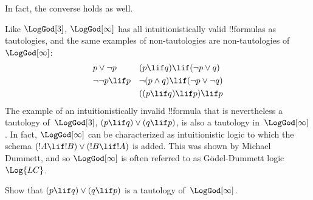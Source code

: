 \documentclass[../../../include/open-logic-section]{subfiles}
\begin{document}
In fact, the converse holds as well.

Like $\LogGod[3]$, $\LogGod[\infty]$ has all intuitionistically valid
!!{formula}s as tautologies, and the same examples of non-tautologies
are non-tautologies of~$\LogGod[\infty]$:
\begin{align*}
  & p \lor \lnot p && (p \lif q) \lif (\lnot p \lor q) \\
  & \lnot\lnot p \lif p && \lnot(p \land q) \lif (\lnot p \lor \lnot q) \\
  &&& ((p \lif q) \lif p) \lif p
\end{align*}
The example of an intuitionistically invalid !!{formula} that is
nevertheless a tautology of~$\LogGod[3]$, $(p \lif q) \lor (q \lif
p)$, is also a tautology in~$\LogGod[\infty]$. In fact,
$\LogGod[\infty]$ can be characterized as intuitionistic logic to
which the schema $(!A \lif !B) \lor (!B \lif !A)$ is added. This was
shown by Michael Dummett, and so $\LogGod[\infty]$ is often referred to
as G\"odel-Dummett logic~$\Log{LC}$.

\begin{prob}
  Show that $(p \lif q) \lor (q \lif p)$ is a
  tautology of~$\LogGod[\infty]$.
\end{prob}
\end{document}
